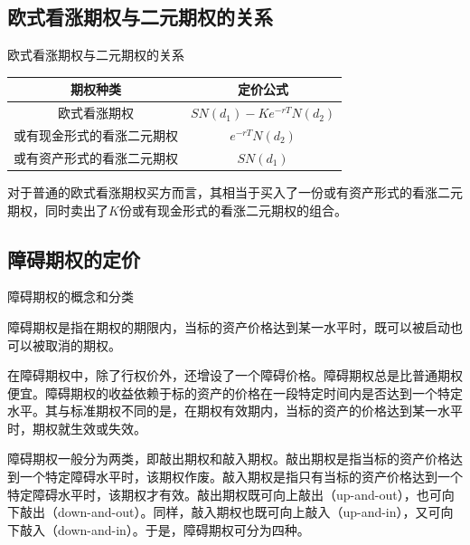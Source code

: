 \documentclass[t]{beamer}
\begin{document}
\subsection{欧式看涨期权与二元期权的关系}
\begin{frame}{欧式看涨期权与二元期权的关系}\Large
\begin{center}
\begin{tabular}{cc}
\hline
期权种类 & 定价公式   \\
\hline
欧式看涨期权 &  $SN(d_1)-Ke^{-rT}N(d_2)$  \\
或有现金形式的看涨二元期权 &  $e^{-rT}N(d_2)$  \\
或有资产形式的看涨二元期权 &  $SN(d_1)$  \\
\hline
\end{tabular}
\end{center}

\begin{block}{}
对于普通的欧式看涨期权买方而言，其相当于{\color{red}买入}了一份或有资产形式的看涨二元期权，同时{\color{magenta}卖出}了$K$份或有现金形式的看涨二元期权的组合。
\end{block}
\end{frame}

\subsection{障碍期权的定价}



\begin{frame}{障碍期权的概念和分类}\small
	\begin{spacing}{1.3}
		障碍期权是指在期权的期限内，当标的资产价格达到某一水平时，既可以被启动也可以被取消的期权。
	
	在障碍期权中，除了行权价外，还增设了一个障碍价格。障碍期权总是比普通期权便宜。障碍期权的收益依赖于标的资产的价格在一段特定时间内是否达到一个特定水平。其与标准期权不同的是，在期权有效期内，当标的资产的价格达到某一水平时，期权就生效或失效。

	障碍期权一般分为两类，即敲出期权和敲入期权。敲出期权是指当标的资产价格达到一个特定障碍水平时，该期权作废。敲入期权是指只有当标的资产价格达到一个特定障碍水平时，该期权才有效。敲出期权既可向上敲出（up-and-out），也可向下敲出（down-and-out）。同样，敲入期权也既可向上敲入（up-and-in），又可向下敲入（down-and-in）。于是，障碍期权可分为四种。
	\end{spacing}
	

\end{frame}
\end{document}

